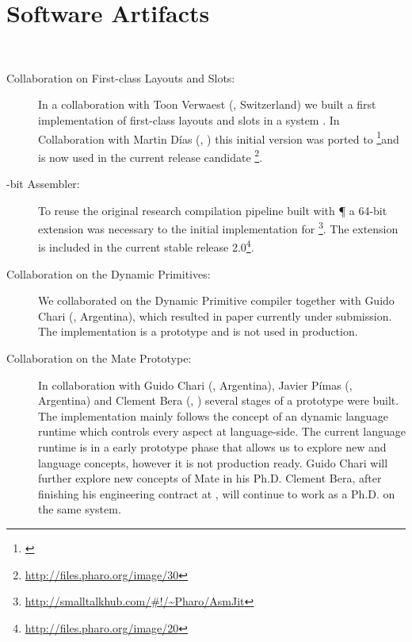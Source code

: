 \section{Software Artifacts}
 \\
\begin{description}
	\item[Collaboration on First-class Layouts and Slots:]
		In a collaboration with Toon Verwaest (\SCG, Switzerland) we built a first implementation of first-class layouts and slots in a \ST system \cite{Verw11a}.
		In Collaboration with Martin Días (\RMoD, \INRIA) this initial version was ported to \PH\footnote{\url{}}and is now used in the current release candidate \footnote{\url{http://files.pharo.org/image/30}}.

	\item[-bit Assembler:]
		To reuse the original research compilation pipeline built with \P \cite{Verw10a, Brun11a} a 64-bit extension was necessary to the initial \AsmJIT implementation for \PH\footnote{\url{http://smalltalkhub.com/\#!/~Pharo/AsmJit}}.
		The extension is included in the current stable \PH release 2.0\footnote{\url{http://files.pharo.org/image/20}}.

	\item[Collaboration on the \WF Dynamic Primitives:]
		We collaborated on the \WF Dynamic Primitive compiler together with Guido Chari (\UBA, Argentina), which resulted in paper currently under submission\cite{Char13a}.
		The implementation is a prototype and is not used in production.

	\item[Collaboration on the Mate \VM Prototype:]
		In collaboration with Guido Chari (\UBA, Argentina), Javier Pímas (\UBA, Argentina) and Clement Bera (\RMoD, \INRIA) several stages of a prototype \VM were built.
		The implementation mainly follows the concept of an dynamic language runtime which controls every aspect at language-side.
		The current language runtime is in a early prototype phase that allows us to explore new \VM and language concepts, however it is not production ready.
		Guido Chari will further explore new concepts of Mate in his Ph.D.
		Clement Bera, after finishing his engineering contract at \RMoD, will continue to work as a Ph.D. on the same system.


\end{description}
